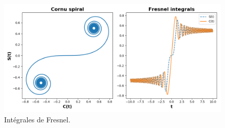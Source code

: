 \documentclass[%
oneside,                 %
final,                   %
10pt,french]{article}
\begin{document}
\begin{figure}[!ht]  %
  \centerline{\includegraphics[width=0.7\linewidth]{imgs/Fresnel.png}}
  \caption{
  Intégrales de Fresnel. \label{fig:Fresnel}
  }
\end{figure}



\end{document}
